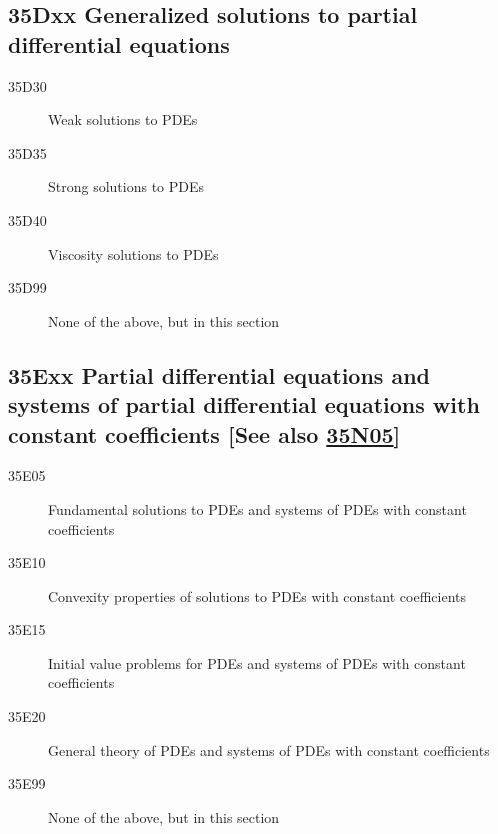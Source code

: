 \subsection*{35Dxx  Generalized solutions to  partial differential equations}\label{35Dxx}
\begin{description}  
\item [35D30]\label{35D30} Weak solutions to PDEs
\item [35D35]\label{35D35} Strong solutions to PDEs
\item [35D40]\label{35D40} Viscosity solutions to PDEs
\item [35D99]\label{35D99} None of the above, but in this section
\end{description}
\subsection*{35Exx  Partial differential equations and systems of partial differential equations with constant coefficients [See also \hyperref[35N05]{35N05}] }\label{35Exx}
\begin{description}  
\item [35E05]\label{35E05} Fundamental solutions to PDEs and systems of  PDEs with constant coefficients
\item [35E10]\label{35E10} Convexity properties of solutions to PDEs with constant coefficients
\item [35E15]\label{35E15} Initial value problems for PDEs and systems of PDEs with constant coefficients
\item [35E20]\label{35E20} General theory of PDEs and systems of  PDEs with constant coefficients
\item [35E99]\label{35E99} None of the above, but in this section
\end{description}
